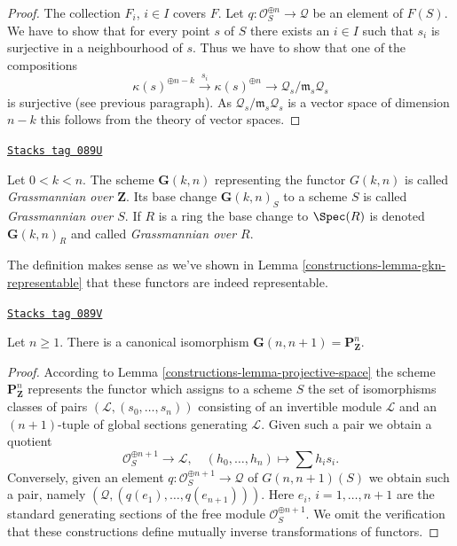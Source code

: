 \begin{proof}
\medskip\noindent
The collection $F_i$, $i \in I$ covers $F$. Let
$q : \mathcal{O}_S^{\oplus n} \to \mathcal{Q}$ be an element of
$F(S)$. We have to show that for every point $s$ of $S$ there exists
an $i \in I$ such that $s_i$ is surjective in a neighbourhood of $s$.
Thus we have to show that one of the compositions
$$
\kappa(s)^{\oplus n - k} \xrightarrow{s_i}
\kappa(s)^{\oplus n} \rightarrow
\mathcal{Q}_s/\mathfrak m_s\mathcal{Q}_s
$$
is surjective (see previous paragraph). As
$\mathcal{Q}_s/\mathfrak m_s\mathcal{Q}_s$ is a vector space of
dimension $n - k$ this follows from the theory of vector spaces.
\end{proof}

\begin{definition}[Grassmannian]
\label{constructions-definition-grassmannian}
\href{https://stacks.math.columbia.edu/tag/089U}{\texttt{Stacks tag 089U}}

Let $0 < k < n$. The scheme $\mathbf{G}(k, n)$ representing the functor
$G(k, n)$ is called {\it Grassmannian over $\mathbf{Z}$}.
Its base change $\mathbf{G}(k, n)_S$ to a scheme $S$ is called
{\it Grassmannian over $S$}. If $R$ is a ring the base change
to $\Spec(R)$ is denoted $\mathbf{G}(k, n)_R$ and called
{\it Grassmannian over $R$}.
\end{definition}

The definition makes sense as we've shown in
Lemma \ref{constructions-lemma-gkn-representable}
that these functors are indeed representable.

\begin{lemma}
\label{constructions-lemma-projective-space-grassmannian}
\href{https://stacks.math.columbia.edu/tag/089V}{\texttt{Stacks tag 089V}}

Let $n \geq 1$. There is a canonical isomorphism
$\mathbf{G}(n, n + 1) = \mathbf{P}^n_\mathbf{Z}$.
\end{lemma}

\begin{proof}

According to Lemma \ref{constructions-lemma-projective-space} the scheme
$\mathbf{P}^n_\mathbf{Z}$ represents the functor
which assigns to a scheme $S$ the set of isomorphisms classes
of pairs $(\mathcal{L}, (s_0, \ldots, s_n))$ consisting of
an invertible module $\mathcal{L}$ and an $(n + 1)$-tuple
of global sections generating $\mathcal{L}$.
Given such a pair we obtain a quotient
$$
\mathcal{O}_S^{\oplus n + 1} \longrightarrow \mathcal{L},\quad
(h_0, \ldots, h_n) \longmapsto \sum h_i s_i.
$$
Conversely, given an element
$q : \mathcal{O}_S^{\oplus n + 1} \to \mathcal{Q}$ of $G(n, n + 1)(S)$
we obtain such a pair, namely $(\mathcal{Q}, (q(e_1), \ldots, q(e_{n + 1})))$.
Here $e_i$, $i = 1, \ldots, n + 1$ are the standard generating sections
of the free module $\mathcal{O}_S^{\oplus n + 1}$.
We omit the verification that these constructions define mutually
inverse transformations of functors.
\end{proof}



